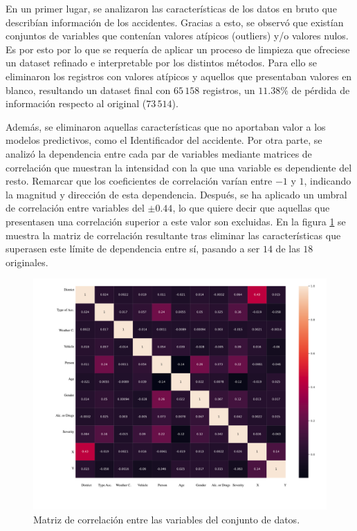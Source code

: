 \documentclass{uathesis-es}
\begin{document}
{%

En un primer lugar, se analizaron las características de los datos en bruto que describían información de los accidentes. Gracias a esto, se observó que existían conjuntos de variables que contenían valores atípicos (outliers) y/o valores nulos. Es por esto por lo que se requería de aplicar un proceso de limpieza que ofreciese un dataset refinado e interpretable por los distintos métodos. Para ello se eliminaron los registros con valores atípicos y aquellos que presentaban valores en blanco, resultando un dataset final con $65\,158$ registros, un $11.38\%$ de pérdida de información respecto al original ($73\,514$).


Además, se eliminaron aquellas características que no aportaban valor a los modelos predictivos, como el Identificador del accidente. Por otra parte, se analizó la dependencia entre cada par de variables mediante matrices de correlación que muestran la intensidad con la que una variable es dependiente del resto. Remarcar que los coeficientes de correlación varían entre $-1$ y $1$, indicando la magnitud y dirección de esta dependencia. Después, se ha aplicado un umbral de correlación entre variables del $\pm 0.44$, lo que quiere decir que aquellas que presentasen una correlación superior a este valor son excluidas. En la figura \ref{CorrelationMatrix} se muestra la matriz de correlación resultante tras eliminar las características que superasen este límite de dependencia entre sí, pasando a ser $14$ de las $18$ originales.

 \begin{figure}[H]
	\centering
	\includegraphics[width=14cm]{Figures/1stPaper/CorrelationMatrix.png}
	\caption{Matriz de correlación entre las variables del conjunto de datos.}
	\label{CorrelationMatrix}
\end{figure}


}
\end{document}
